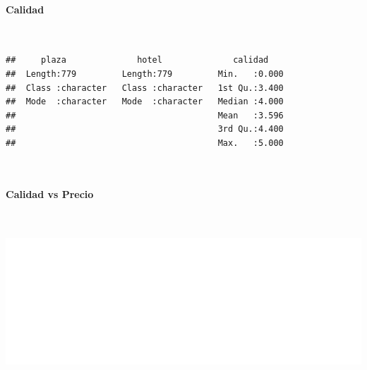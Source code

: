 \documentclass{article}\usepackage[]{graphicx}\usepackage[]{color}
\makeatletter
\def\maxwidth{ %
  \ifdim\Gin@nat@width>\linewidth
    \linewidth
  \else
    \Gin@nat@width
  \fi
}
\newenvironment{kframe}{%
 \def\at@end@of@kframe{}%
 \ifinner\ifhmode%
  \def\at@end@of@kframe{\end{minipage}}%
  \begin{minipage}{\columnwidth}%
 \fi\fi%
 \def\FrameCommand##1{\hskip\@totalleftmargin \hskip-\fboxsep
 \colorbox{shadecolor}{##1}\hskip-\fboxsep
     \hskip-\linewidth \hskip-\@totalleftmargin \hskip\columnwidth}%
 \MakeFramed {\advance\hsize-\width
   \@totalleftmargin\z@ \linewidth\hsize
   \@setminipage}}%
 {\par\unskip\endMakeFramed%
 \at@end@of@kframe}
\newenvironment{knitrout}{}{} %
\makeatother
\begin{document}
\paragraph{Calidad}
~\\
\begin{knitrout}
\color{fgcolor}\begin{kframe}
\begin{verbatim}
##     plaza              hotel              calidad     
##  Length:779         Length:779         Min.   :0.000  
##  Class :character   Class :character   1st Qu.:3.400  
##  Mode  :character   Mode  :character   Median :4.000  
##                                        Mean   :3.596  
##                                        3rd Qu.:4.400  
##                                        Max.   :5.000
\end{verbatim}
\end{kframe}
\end{knitrout}
~\\
\paragraph{Calidad vs Precio}
~\\
\begin{knitrout}
\color{fgcolor}\begin{kframe}


{\ttfamily\noindent\bfseries{}}\end{kframe}
\includegraphics[width=\maxwidth]{figures/CalidadvsPrecio-1} 

\end{knitrout}
\end{document}
